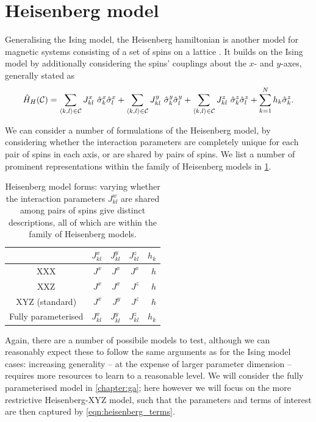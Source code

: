 \section{Heisenberg model}\label{sec:heisenberg}
Generalising the Ising model, the Heisenberg \gls{hamiltonian} is another model for magnetic systems consisting of a set of 
spins on a lattice \cite{greiner2012thermodynamics}. 
It builds on the Ising model by additionally considering the spins' couplings about the $x$- and $y$-axes, generally stated as 
\begin{equation}
\label{eqn:heisenberg_model_general}
\hat{H}_H({ \mathcal{C}}) = 
\sum\limits_{{ \langle k, l \rangle } \in { \mathcal{C}}} J^x_{kl} \  \hat{\sigma}^x_k \hat{\sigma}^x_l
+ \sum\limits_{{ \langle k, l \rangle } \in { \mathcal{C}}} J^y_{kl} \ \hat{\sigma}^y_k \hat{\sigma}^y_l
+ \sum\limits_{{ \langle k, l \rangle } \in { \mathcal{C}}} J^z_{kl} \ \hat{\sigma}^z_k \hat{\sigma}^z_l
+ \sum\limits_{k=1}^{N} h_k \hat{\sigma}^z_k.
\end{equation}

We can consider a number of formulations of the Heisenberg model, by considering whether the interaction
parameters are completely unique for each pair of spins in each axis, 
or  are shared by pairs of spins.
We list a number of prominent representations within the family of Heisenberg models in \cref{table:heisenberg_models}. 
\begin{table}[h]
\begin{center}
    \begin{tabular}{crrrr}
         & $J^{x}_{kl}$ & $J^{y}_{kl}$ & $J^{z}_{kl}$ & $h_{k}$ \\
        \hline
        XXX & $J^x$ & $J^x$ & $J^x$ & $h$ \\
        XXZ & $J^x$ & $J^x$ & $J^z$ & $h$ \\
        XYZ (standard) & $J^x$ & $J^y$ & $J^z$ & $h$ \\
        Fully parameterised & $J^x_{kl}$ & $J^y_{kl}$ & $J^z_{kl}$ & $h_k$ \\
        
    \end{tabular}
\end{center}
\caption[Forms of Heisenberg model]{
    Heisenberg model forms: varying whether the interaction parameters $J^{w}_{kl}$ are shared among pairs of spins
    give distinct descriptions, all of which are within the family of Heisenberg models. 
}
\label{table:heisenberg_models}
\end{table}

Again, there are a number of possibile models to test, 
although we can reasonably expect these to follow the same arguments as for the Ising model cases: 
increasing generality -- at the expense of larger parameter dimension -- 
requires more resources to learn to a reasonable level.    
We will consider the fully parameterised model in \cref{chapter:ga};
here however we will focus on the more restrictive Heisenberg-XYZ model,
such that the parameters and terms of interest are then captured by \cref{eqn:heisenberg_terms}.

